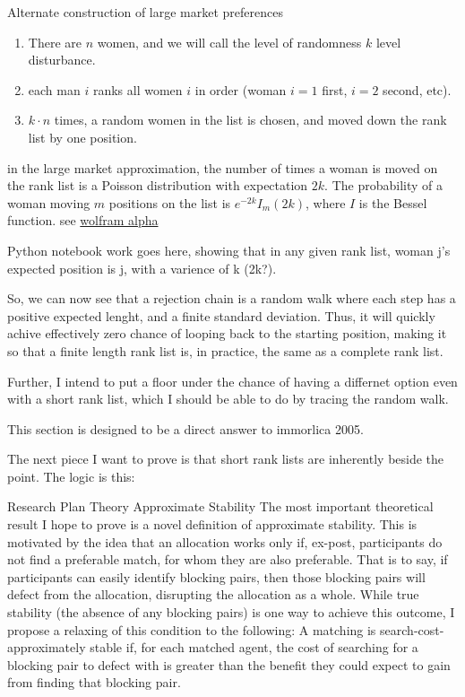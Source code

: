 \documentclass[WP]{AEA}
\begin{document}
Alternate construction of large market preferences

\begin{enumerate}
	\item There are $n$ women, and we will call the level of randomness $k$ level disturbance.
	\item each man $i$ ranks all women $i$ in order (woman $i=1$ first, $i=2$ second, etc). 
	\item $k \cdot n$ times, a random women in the list is chosen, and moved down the rank list by one position.
\end{enumerate}

in the large market approximation, the number of times a woman is moved on the rank list is a Poisson distribution with expectation $2k$.  The probability of a woman moving $m$ positions on the list is $e^{-2k}I_m(2k)$, where $I$ is the Bessel function.  see \href{https://www.wolframalpha.com/input/?i=e%5E-10*BesselI%286%2C+10%29}{wolfram alpha}
	
Python notebook work goes here, showing that in any given rank list, woman j's expected position is j, with a varience of k (2k?).

So, we can now see that a rejection chain is a random walk where each step has a positive expected lenght, and a finite standard deviation.  Thus, it will quickly achive effectively zero chance of looping back to the starting position, making it so that a finite length rank list is, in practice, the same as a complete rank list.

Further, I intend to put a floor under the chance of having a differnet option even with a short rank list, which I should be able to do by tracing the random walk.

This section is designed to be a direct answer to immorlica 2005.




The next piece I want to prove is that short rank lists are inherently beside the point.  The logic is this: 









Research Plan
Theory
Approximate Stability
The most important theoretical result I hope to prove is a novel definition of approximate stability.  This is motivated by the idea that an allocation works only if, ex-post, participants do not find a preferable match, for whom they are also preferable.  That is to say, if participants can easily identify blocking pairs, then those blocking pairs will defect from the allocation, disrupting the allocation as a whole.
While true stability (the absence of any blocking pairs) is one way to achieve this outcome, I propose a relaxing of this condition to the following:
A matching is search-cost-approximately stable if, for each matched agent, the cost of searching for a blocking pair to defect with is greater than the benefit they could expect to gain from finding that blocking pair.
\end{document}
